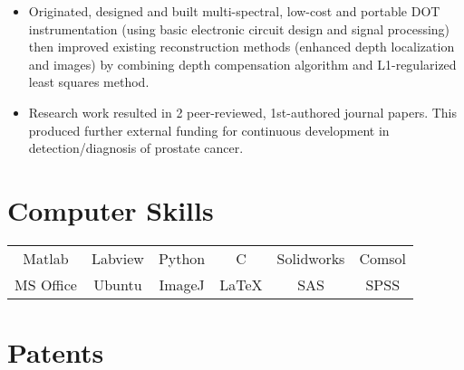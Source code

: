 \documentclass{my_cv}
\begin{document}
\begin{flushleft}
\begin{itemize}
\item Originated, designed and built multi-spectral, low-cost and portable DOT instrumentation (using basic electronic circuit design and signal processing) then improved existing reconstruction methods (enhanced depth localization and images) by combining depth compensation algorithm and L1-regularized least squares method.

\item Research work resulted in 2 peer-reviewed, 1st-authored journal papers. This produced further external funding for continuous development in detection/diagnosis of prostate cancer.

\end{itemize}
\end{flushleft}
 

\vspace{-7mm} %


\section{Computer Skills}

\vspace{2pt} %
\begin{center}

\begin{tabular}{c|c|c|c|c|c} Matlab & Labview & Python & C &Solidworks &Comsol \\
MS Office& Ubuntu & ImageJ &\LaTeX &SAS &SPSS\end{tabular}
\end{center}


\vspace{-7mm}  %


\section{{Patents}} 
\end{document}

